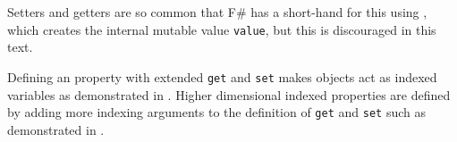 Setters and getters are so common that F\# has a short-hand for this using , which creates the internal mutable value \lstinline{value}, but this is discouraged in this text.

Defining an  property with extended \lstinline{get} and \lstinline{set} makes objects act as indexed variables as demonstrated in .
%
% 
Higher dimensional indexed properties are defined by adding more indexing arguments to the definition of \lstinline{get} and \lstinline{set} such as demonstrated in .
%
% 


